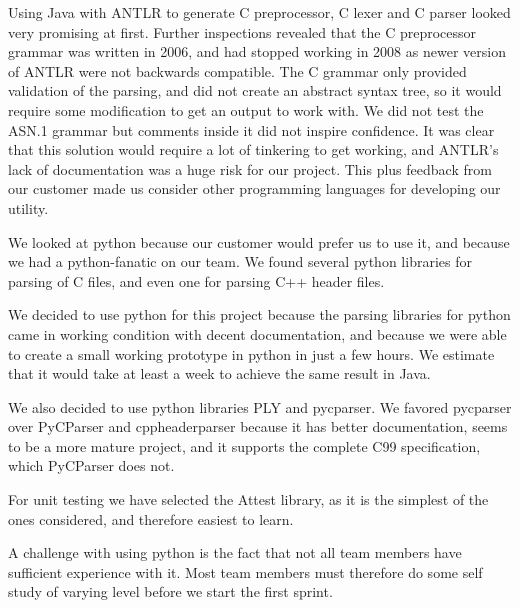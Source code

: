 Using Java with ANTLR to generate C preprocessor, C lexer and C parser looked
very promising at first. Further inspections revealed that the C preprocessor
grammar was written in 2006, and had stopped working in 2008 as newer version
of ANTLR were not backwards compatible. The C grammar only provided validation
of the parsing, and did not create an abstract syntax tree, so it would require
some modification to get an output to work with. We did not test the ASN.1
grammar but comments inside it did not inspire confidence. It was clear that
this solution would require a lot of tinkering to get working, and ANTLR’s lack
of documentation was a huge risk for our project. This plus feedback from our
customer made us consider other programming languages for developing our
utility.

We looked at python because our customer would prefer us to use it, and because
we had a python-fanatic on our team. We found several python libraries for
parsing of C files, and even one for parsing C++ header files.

We decided to use python for this project because the parsing libraries for
python came in working condition with decent documentation, and because we
were able to create a small working prototype in python in just a few hours.
We estimate that it would take at least a week to achieve the same result in
Java.

We also decided to use python libraries PLY and pycparser. We favored pycparser
over PyCParser and cppheaderparser because it has better documentation, seems
to be a more mature project, and it supports the complete C99 specification,
which PyCParser does not.

For unit testing we have selected the Attest library, as it is the simplest of
the ones considered, and therefore easiest to learn.

A challenge with using python is the fact that not all team members have
sufficient experience with it. Most team members must therefore do some self
study of varying level before we start the first sprint.

